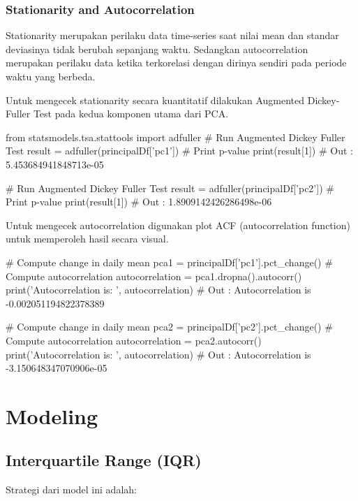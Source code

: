         \subsubsection{Stationarity and Autocorrelation}

        Stationarity merupakan perilaku data time-series saat nilai mean dan standar deviasinya tidak berubah sepanjang waktu. Sedangkan autocorrelation merupakan perilaku data ketika terkorelasi dengan dirinya sendiri pada periode waktu yang berbeda.

        Untuk mengecek stationarity secara kuantitatif dilakukan Augmented Dickey-Fuller Test pada kedua komponen utama dari PCA.

\begin{python}
from statsmodels.tsa.stattools import adfuller
# Run Augmented Dickey Fuller Test
result = adfuller(principalDf['pc1'])
# Print p-value
print(result[1])
# Out : 5.453684941848713e-05

# Run Augmented Dickey Fuller Test
result = adfuller(principalDf['pc2'])
# Print p-value
print(result[1])
# Out : 1.8909142426286498e-06
\end{python}

        Untuk mengecek autocorrelation digunakan plot ACF (autocorrelation function) untuk memperoleh hasil secara visual.

\begin{python}
# Compute change in daily mean 
pca1 = principalDf['pc1'].pct_change()
# Compute autocorrelation
autocorrelation = pca1.dropna().autocorr()
print('Autocorrelation is: ', autocorrelation)
# Out : Autocorrelation is -0.002051194822378389

# Compute change in daily mean 
pca2 = principalDf['pc2'].pct_change()
# Compute autocorrelation
autocorrelation = pca2.autocorr()
print('Autocorrelation is: ', autocorrelation)
# Out : Autocorrelation is -3.150648347070906e-05
\end{python}

\section{Modeling}

    \subsection{Interquartile Range (IQR)}

    Strategi dari model ini adalah: \cite{metode_acuan}

